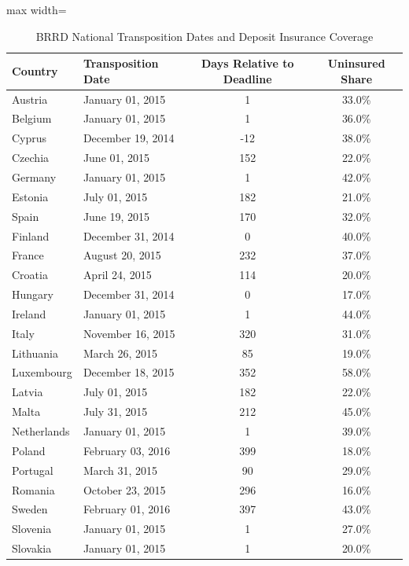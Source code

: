\begin{table}[htbp]
\centering
\caption{BRRD National Transposition Dates and Deposit Insurance Coverage}
\label{tab:brrd_dates}
\begin{adjustbox}{max width=\textwidth}
\begin{tabular}{llcc}
\toprule
Country & Transposition Date & Days Relative to Deadline & Uninsured Share \\
\midrule
Austria & January 01, 2015 & 1 & 33.0\% \\
Belgium & January 01, 2015 & 1 & 36.0\% \\
Cyprus & December 19, 2014 & -12 & 38.0\% \\
Czechia & June 01, 2015 & 152 & 22.0\% \\
Germany & January 01, 2015 & 1 & 42.0\% \\
Estonia & July 01, 2015 & 182 & 21.0\% \\
Spain & June 19, 2015 & 170 & 32.0\% \\
Finland & December 31, 2014 & 0 & 40.0\% \\
France & August 20, 2015 & 232 & 37.0\% \\
Croatia & April 24, 2015 & 114 & 20.0\% \\
Hungary & December 31, 2014 & 0 & 17.0\% \\
Ireland & January 01, 2015 & 1 & 44.0\% \\
Italy & November 16, 2015 & 320 & 31.0\% \\
Lithuania & March 26, 2015 & 85 & 19.0\% \\
Luxembourg & December 18, 2015 & 352 & 58.0\% \\
Latvia & July 01, 2015 & 182 & 22.0\% \\
Malta & July 31, 2015 & 212 & 45.0\% \\
Netherlands & January 01, 2015 & 1 & 39.0\% \\
Poland & February 03, 2016 & 399 & 18.0\% \\
Portugal & March 31, 2015 & 90 & 29.0\% \\
Romania & October 23, 2015 & 296 & 16.0\% \\
Sweden & February 01, 2016 & 397 & 43.0\% \\
Slovenia & January 01, 2015 & 1 & 27.0\% \\
Slovakia & January 01, 2015 & 1 & 20.0\% \\
\bottomrule
\end{tabular}
\end{adjustbox}
\begin{tablenotes}[flushleft]

\end{tablenotes}
\end{table}
